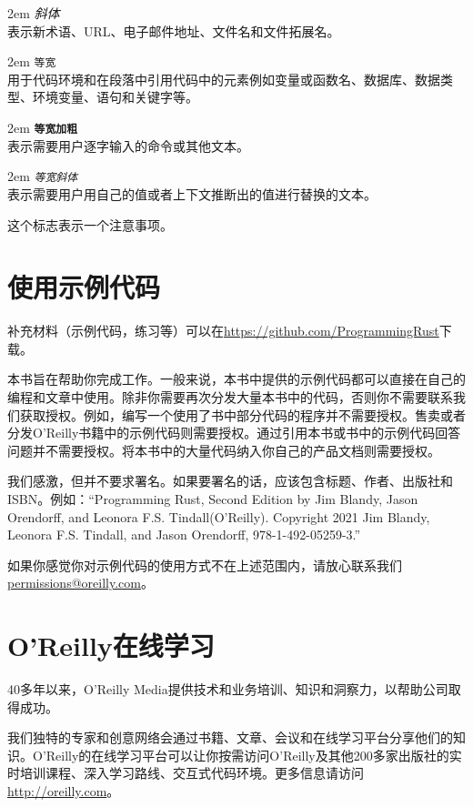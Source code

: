 \hangindent 2em
\noindent
\emph{斜体}\\
表示新术语、URL、电子邮件地址、文件名和文件拓展名。

\hangindent 2em
\noindent
\texttt{等宽}\\
用于代码环境和在段落中引用代码中的元素例如变量或函数名、数据库、数据类型、环境变量、语句和关键字等。

\hangindent 2em
\noindent
\textbf{\texttt{等宽加粗}}\\
表示需要用户逐字输入的命令或其他文本。

\hangindent 2em
\noindent
\emph{\texttt{等宽斜体}}\\
表示需要用户用自己的值或者上下文推断出的值进行替换的文本。

\begin{note}
    这个标志表示一个注意事项。
\end{note}

\section*{使用示例代码}
补充材料（示例代码，练习等）可以在\url{https://github.com/ProgrammingRust}下载。

本书旨在帮助你完成工作。一般来说，本书中提供的示例代码都可以直接在自己的编程和文章中使用。除非你需要再次分发大量本书中的代码，否则你不需要联系我们获取授权。例如，编写一个使用了书中部分代码的程序并不需要授权。售卖或者分发O'Reilly书籍中的示例代码则需要授权。通过引用本书或书中的示例代码回答问题并不需要授权。将本书中的大量代码纳入你自己的产品文档则需要授权。

我们感激，但并不要求署名。如果要署名的话，应该包含标题、作者、出版社和ISBN。例如：“Programming Rust, Second Edition by Jim Blandy, Jason Orendorff, and Leonora F.S. Tindall(O’Reilly). Copyright 2021 Jim Blandy, Leonora F.S. Tindall, and Jason Orendorff, 978-1-492-05259-3.”

如果你感觉你对示例代码的使用方式不在上述范围内，请放心联系我们\url{permissions@oreilly.com}。

\section*{O'Reilly在线学习}
\begin{note}
    40多年以来，O'Reilly Media提供技术和业务培训、知识和洞察力，以帮助公司取得成功。
\end{note}

我们独特的专家和创意网络会通过书籍、文章、会议和在线学习平台分享他们的知识。O'Reilly的在线学习平台可以让你按需访问O'Reilly及其他200多家出版社的实时培训课程、深入学习路线、交互式代码环境。更多信息请访问\url{http://oreilly.com}。


